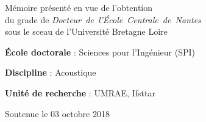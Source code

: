 \begin{cover}

  
  \noindent
  \begin{minipage}{8.9cm} %
    \noindent
    Mémoire présenté en vue de l'obtention \\ du grade de \mbox{\emph{Docteur de l'\'Ecole Centrale de Nantes}} \\sous le sceau de l'Université Bretagne Loire
    \bigskip

    \noindent
    \textbf{\'Ecole doctorale} : Sciences pour l'Ingénieur (SPI)
    \medskip

    \noindent
    \textbf{Discipline} : Acoustique
    \medskip

    \noindent
    \textbf{Unité de recherche} : UMRAE, Ifsttar
    \medskip

    \noindent
    Soutenue le 03 octobre 2018
  \end{minipage}


  \begin{center}
    \scshape\color{titlecolor}%
    {\LARGE\bfseries\thesisTitle\bigskip}

  \end{center}


\end{cover}
